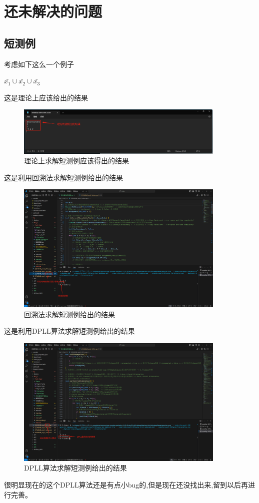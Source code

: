 \section{还未解决的问题}
    \subsection{短测例}
    \par
    考虑如下这么一个例子
    \begin{center}
        $\bar{x_{1}} \cup \bar{x_{2}} \cup \bar{x_{3}}$
    \end{center}
    \par
    这是理论上应该给出的结果
    \begin{figure}[H]
        \centering
        \includegraphics[width=10cm]{Figure/Figure_4.jpg}
        \caption{理论上求解短测例应该得出的结果}
    \end{figure}
    \par
    这是利用回溯法求解短测例给出的结果
    \begin{figure}[H]
        \centering
        \includegraphics[width=10cm]{Figure/Figure_5.jpg}
        \caption{回溯法求解短测例给出的结果}
    \end{figure}
    \par
    这是利用DPLL算法求解短测例给出的结果
    \begin{figure}[H]
        \centering
        \includegraphics[width=10cm]{Figure/Figure_6.jpg}
        \caption{DPLL算法求解短测例给出的结果}
    \end{figure}
    \par
    很明显现在的这个DPLL算法还是有点小bug的,但是现在还没找出来,留到以后再进行完善。

